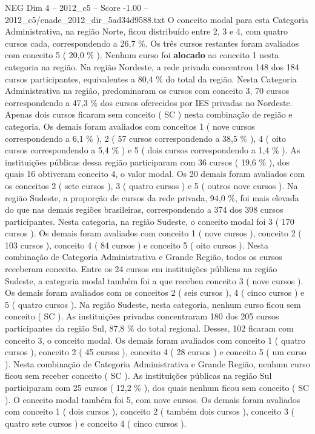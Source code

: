 \begin{textsample}{NEG Dim 4 – 2012\_c5 – Score -1.00 – 2012\_c5/enade\_2012\_dir\_5ad34d9588.txt}
O conceito modal para esta Categoria Administrativa, na região Norte, ficou distribuído entre 2, 3 e 4, com quatro cursos cada, correspondendo a 26,7 \%.
Os três cursos restantes foram avaliados com conceito 5 ( 20,0 \% ).
Nenhum curso foi \textbf{alocado} ao conceito 1 nesta categoria na região.
Na região Nordeste, a rede privada concentrou 148 dos 184 cursos participantes, equivalentes a 80,4 \% do total da região.
Nesta Categoria Administrativa na região, predominaram os cursos com conceito 3, 70 cursos correspondendo a 47,3 \% dos cursos oferecidos por IES privadas no Nordeste.
Apenas dois cursos ficaram sem conceito ( SC ) nesta combinação de região e categoria.
Os demais foram avaliados com conceitos 1 ( nove cursos correspondendo a 6,1 \% ), 2 ( 57 cursos correspondendo a 38,5 \% ), 4 ( oito cursos correspondendo a 5,4 \% ) e 5 ( dois cursos correspondendo a 1,4 \% ).
As instituições públicas dessa região participaram com 36 cursos ( 19,6 \% ), dos quais 16 obtiveram conceito 4, o valor modal.
Os 20 demais foram avaliados com os conceitos 2 ( sete cursos ), 3 ( quatro cursos ) e 5 ( outros nove cursos ).
Na região Sudeste, a proporção de cursos da rede privada, 94,0 \%, foi mais elevada do que nas demais regiões brasileiras, correspondendo a 374 dos 398 cursos participantes.
Nesta categoria, na região Sudeste, o conceito modal foi 3 ( 170 cursos ).
Os demais foram avaliados com conceito 1 ( nove cursos ), conceito 2 ( 103 cursos ), conceito 4 ( 84 cursos ) e conceito 5 ( oito cursos ).
Nesta combinação de Categoria Administrativa e Grande Região, todos os cursos receberam conceito.
Entre os 24 cursos em instituições públicas na região Sudeste, a categoria modal também foi a que recebeu conceito 3 ( nove cursos ).
Os demais foram avaliados com os conceitos 2 ( seis cursos ), 4 ( cinco cursos ) e 5 ( quatro cursos ).
Na região Sudeste, nesta categoria, nenhum curso ficou sem conceito ( SC ).
As instituições privadas concentraram 180 dos 205 cursos participantes da região Sul, 87,8 \% do total regional.
Desses, 102 ficaram com conceito 3, o conceito modal.
Os demais foram avaliados com conceito 1 ( quatro cursos ), conceito 2 ( 45 cursos ), conceito 4 ( 28 cursos ) e conceito 5 ( um curso ).
Nesta combinação de Categoria Administrativa e Grande Região, nenhum curso ficou sem receber conceito ( SC ).
As instituições públicas na região Sul participaram com 25 cursos ( 12,2 \% ), dos quais nenhum ficou sem conceito ( SC ).
O conceito modal também foi 5, com nove cursos.
Os demais foram avaliados com conceito 1 ( dois cursos ), conceito 2 ( também dois cursos ), conceito 3 ( quatro sete cursos ) e conceito 4 ( cinco cursos ).

\end{textsample}
